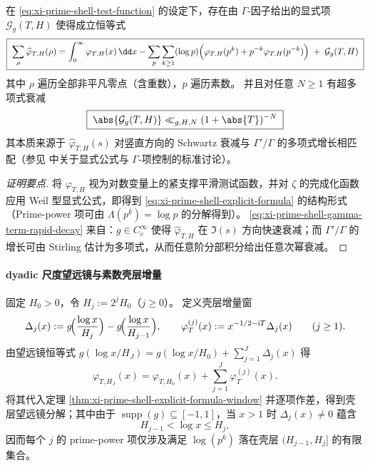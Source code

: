 \begin{theorem}\label{thm:xi-prime-shell-explicit-formula-window}
在 \eqref{eq:xi-prime-shell-test-function} 的设定下，存在由 \(\Gamma\)-因子给出的显式项 \(\mathcal G_g(T,H)\) 使得成立恒等式
\begin{equation}\label{eq:xi-prime-shell-explicit-formula}
\boxed{\;
\sum_{\rho}\widehat{\varphi}_{T,H}(\rho)
=
\int_{0}^{\infty}\varphi_{T,H}(x)\,\dd x
-\sum_{p}\sum_{k\ge 1}(\log p)\Bigl(\varphi_{T,H}(p^k)+p^{-k}\varphi_{T,H}(p^{-k})\Bigr)
\;+\;\mathcal G_g(T,H)\;}
\end{equation}
其中 \(\rho\) 遍历全部非平凡零点（含重数），\(p\) 遍历素数。
并且对任意 \(N\ge 1\) 有超多项式衰减
\begin{equation}\label{eq:xi-prime-shell-gamma-term-rapid-decay}
\boxed{\;
\abs{\mathcal G_g(T,H)}\ll_{g,H,N}(1+\abs{T})^{-N}\;}
\end{equation}
其本质来源于 \(\widehat{\varphi}_{T,H}(s)\) 对竖直方向的 Schwartz 衰减与 \(\Gamma'/\Gamma\) 的多项式增长相匹配（参见 \cite{Titchmarsh1986RiemannZeta} 中关于显式公式与 \(\Gamma\)-项控制的标准讨论）。
\end{theorem}

\begin{proof}[证明要点]
将 \(\varphi_{T,H}\) 视为对数变量上的紧支撑平滑测试函数，并对 \(\zeta\) 的完成化函数应用 Weil 型显式公式，即得到 \eqref{eq:xi-prime-shell-explicit-formula} 的结构形式（Prime-power 项可由 \(\Lambda(p^k)=\log p\) 的分解得到）。
\eqref{eq:xi-prime-shell-gamma-term-rapid-decay} 来自：\(g\in C_c^\infty\) 使得 \(\widehat{\varphi}_{T,H}\) 在 \(\Im(s)\) 方向快速衰减；而 \(\Gamma'/\Gamma\) 的增长可由 Stirling 估计为多项式，从而任意阶分部积分给出任意次幂衰减。
\end{proof}

\paragraph{dyadic 尺度望远镜与素数壳层增量}
固定 \(H_0>0\)，令 \(H_j:=2^jH_0\)（\(j\ge 0\)）。
定义壳层增量窗
\[
\Delta_j(x):=g\!\Bigl(\frac{\log x}{H_j}\Bigr)-g\!\Bigl(\frac{\log x}{H_{j-1}}\Bigr),
\qquad
\varphi_T^{(j)}(x):=x^{-1/2-\mathrm{i}T}\Delta_j(x)\qquad(j\ge 1).
\]
由望远镜恒等式 \(g(\log x/H_J)=g(\log x/H_0)+\sum_{j=1}^{J}\Delta_j(x)\) 得
\[
\varphi_{T,H_J}(x)=\varphi_{T,H_0}(x)+\sum_{j=1}^{J}\varphi_T^{(j)}(x).
\]
将其代入定理 \ref{thm:xi-prime-shell-explicit-formula-window} 并逐项作差，得到壳层望远镜分解；其中由于 \(\operatorname{supp}(g)\subseteq[-1,1]\)，当 \(x>1\) 时 \(\Delta_j(x)\neq 0\) 蕴含
\begin{equation}\label{eq:xi-prime-shell-support-localization}
H_{j-1}<\log x\le H_j,
\end{equation}
因而每个 \(j\) 的 prime-power 项仅涉及满足 \(\log(p^k)\) 落在壳层 \((H_{j-1},H_j]\) 的有限集合。

